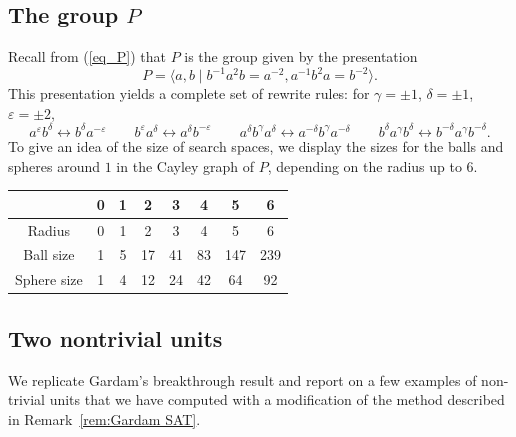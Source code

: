 \documentclass[11pt]{amsart}
\theoremstyle{mythm}
\theoremstyle{mydef}
\theoremstyle{myrem}
\numberwithin{equation}{section}
\begin{document}
\subsection{The group $P$}   Recall from (\ref{eq_P}) that $P$ is the group given by the presentation
\begin{equation*}P = \langle a,b \mid b^{-1}a^2b = a^{-2}, a^{-1}b^{2}a=b^{-2}\rangle.
\end{equation*}
This presentation yields a complete set of rewrite rules: for  $\gamma= \pm 1$, $\delta= \pm 1$, $\varepsilon = \pm 2$,
 \begin{equation} \label{eqn:rewrite} a^{\varepsilon}b^\delta \leftrightarrow b^\delta a^{-\varepsilon} \qquad b^{\varepsilon}a^\delta \leftrightarrow a^\delta b^{-\varepsilon} \qquad a^\delta b^\gamma a^\delta \leftrightarrow a^{-\delta} b^\gamma a^{-\delta}\qquad b^\delta a^\gamma b^\delta \leftrightarrow b^{-\delta} a^\gamma b^{-\delta}. \end{equation}
 To give an idea of the size of search spaces, we  display  the   sizes for  the balls  and spheres  around $1$ in the Cayley graph of $P$, depending on the radius up to 6.  

\begin{center}
	\begin{tabular}{c|ccccccc}
		 & 0 & 1 & 2 & 3 & 4 & 5 & 6 \\
		\hline
		Radius      & 0 & 1 & 2 & 3 & 4 & 5 & 6 \\
		Ball size   & 1 & 5 & 17 & 41 & 83 & 147 & 239 \\
		Sphere size & 1 & 4 & 12 & 24 & 42 & 64 & 92 \\
	\end{tabular}
\end{center}

\subsection{Two nontrivial units} We replicate Gardam's breakthrough result \cite{G} and report on a few examples of non-trivial units that we have computed with a modification of the method described in   Remark~\ref{rem:Gardam SAT}.
\end{document}
